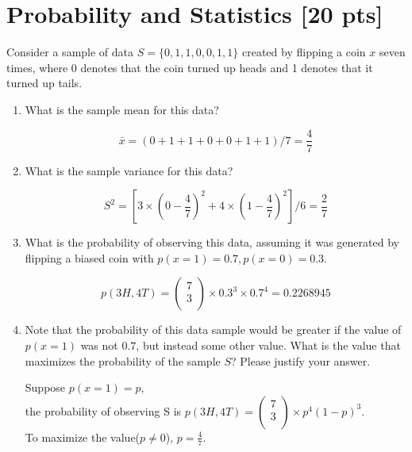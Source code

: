 \documentclass[a4paper]{article}
\theoremstyle{definition}
\newenvironment{soln}{
    \leavevmode\color{blue}\ignorespaces
}{}
\begin{document}
\section{Probability and Statistics [20 pts]}
Consider a sample of data $S = \{0, 1, 1, 0, 0, 1, 1\}$ created by flipping a coin $x$ seven times, where 0 denotes that the coin turned up heads and 1 denotes that it turned up tails.
\begin{enumerate}
	\item 	What is the sample mean for this data?\\
	    \begin{soln}
	    $$
	    \bar{x} = (0+1+1+0+0+1+1)/7 = \frac{4}{7}
	    $$
	    \end{soln}
	\item 	What is the sample variance for this data?\\
	    \begin{soln}
	    $$
	    S^2 = [3\times(0-\frac{4}{7})^2 + 4\times(1-\frac{4}{7})^2]/6 = \frac{2}{7}
	    $$
	    \end{soln}
	\item 	What is the probability of observing this data, assuming it was generated by flipping a biased coin with $p(x=1) = 0.7, p(x=0) = 0.3$.\\
	    \begin{soln}
	    $$
	    p(3H, 4T) = \begin{pmatrix}
	    7 \\
	    3 \\
	    \end{pmatrix}
	    \times 0.3^3 \times 0.7^4 = 0.2268945
	    $$
	    \end{soln}
	\item 	Note that the probability of this data sample would be greater if the value of $p(x = 1)$ was not $0.7$, but instead some other value. What is the value that maximizes the probability of the sample $S$? Please justify your answer.\\
	    \begin{soln}
	    Suppose $p(x=1) = p$,\\
	    the probability of observing S is $p(3H, 4T) = \begin{pmatrix}
	    7 \\
	    3 \\
	    \end{pmatrix}
	    \times p^4(1-p)^3
	    $. \\
	    To maximize the value($p \neq 0$), $p = \frac{4}{7}$.\\

\end{soln}
\end{enumerate}
\end{document}
